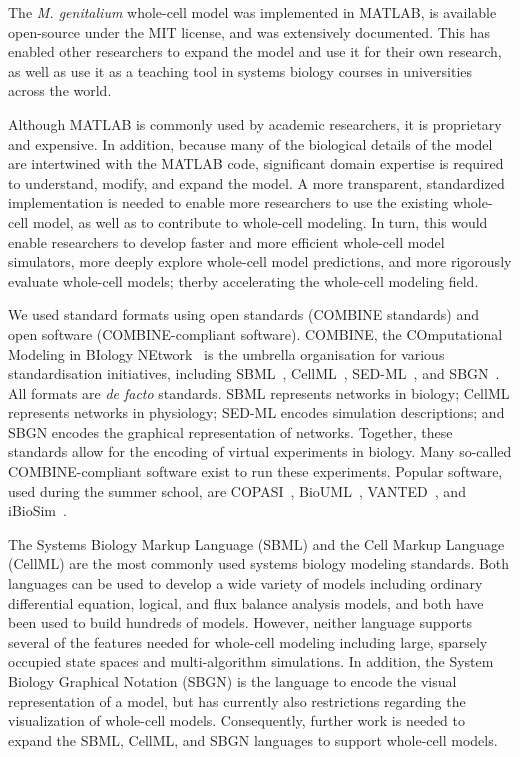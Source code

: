 \documentclass[journal,transmag]{IEEEtran}
\begin{document}
The \textit{M. genitalium} whole-cell model was implemented in MATLAB, is available open-source under the MIT license, and was extensively documented. 
This has enabled other researchers to expand the model and use it for their own research, as well as use it as a teaching tool in systems biology courses in universities across the world. 

Although MATLAB is commonly used by academic researchers, it is proprietary and expensive. In addition, because many of the biological details of the model are intertwined with the MATLAB code, significant domain expertise is required to understand, modify, and expand the model. 
A more transparent, standardized implementation is needed to enable more researchers to use the existing whole-cell model, as well as to contribute to whole-cell modeling. 
In turn, this would enable researchers to develop faster and more efficient whole-cell model simulators, more deeply explore whole-cell model predictions, and more rigorously evaluate whole-cell models; therby accelerating the whole-cell modeling field.


We used standard formats using open standards (COMBINE standards) and open software (COMBINE-compliant software).
COMBINE, the COmputational Modeling in BIology NEtwork~\cite{LeNovere2011} is the umbrella organisation for various standardisation initiatives, including SBML~\cite{hucka2003}, CellML~\cite{hedley_2001b}, SED-ML~\cite{sedml2011}, and SBGN~\cite{LeNovereHMMSS09}. 
All formats are \textit{de facto} standards. 
SBML represents networks in biology; CellML represents networks in physiology; SED-ML encodes simulation descriptions; and SBGN encodes the graphical representation of networks. 
Together, these standards allow for the encoding of virtual experiments in biology. 
Many so-called COMBINE-compliant software exist to run these experiments. 
Popular software, used during the summer school, are COPASI~\cite{Mendes2009}, BioUML~\cite{Kolpakov2006}, VANTED~\cite{Rohn2012}, and iBioSim~\cite{Stevens2013}.

The Systems Biology Markup Language (SBML) and the Cell Markup Language (CellML) are the most commonly used systems biology modeling standards. 
Both languages can be used to develop a wide variety of models including ordinary differential equation, logical, and flux balance analysis models, and both have been used to build hundreds of models. 
However, neither language supports several of the features needed for whole-cell modeling including large, sparsely occupied state spaces and multi-algorithm simulations. 
In addition, the System Biology Graphical Notation (SBGN) is the language to encode the visual representation of a model, but has currently also restrictions regarding the visualization of whole-cell models. 
Consequently, further work is needed to expand the SBML, CellML, and SBGN languages to support whole-cell models.
\end{document}
